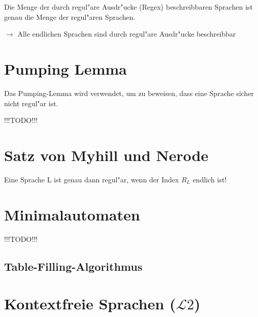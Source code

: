 \documentclass[11pt, a4paper]{scrartcl}
\begin{document}
Die Menge der durch regul"are Ausdr"ucke (Regex) beschreibbaren Sprachen ist genau die Menge der regul"aren Sprachen.

\vspace{0.5em}

$\rightarrow$ Alle endlichen Sprachen sind durch regul"are Ausdr"ucke beschreibbar

\newpage


\section{Pumping Lemma}

Das Pumping-Lemma wird verwendet, um zu beweisen, dass eine Sprache sicher nicht regul"ar ist.

!!!TODO!!!

\newpage

\section{Satz von Myhill und Nerode}

Eine Sprache L ist genau dann regul"ar, wenn der Index $R_L$ endlich ist!

\newpage


\section{Minimalautomaten}

!!!TODO!!!

\subsection{Table-Filling-Algorithmus}

\newpage


\section{Kontextfreie Sprachen ($\mathcal{L}2 $)}
\end{document}
